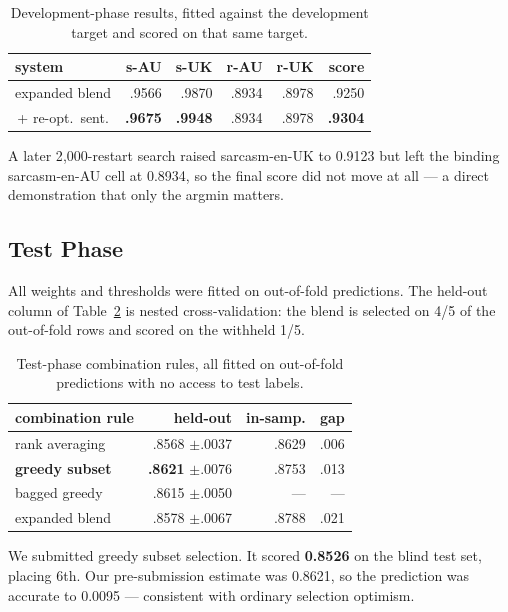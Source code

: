 \documentclass[11pt]{article}
\begin{document}
\begin{table}[t]
\centering\footnotesize
\setlength{\tabcolsep}{3.2pt}
\begin{tabular}{lrrrrr}
\toprule
system & s-AU & s-UK & r-AU & r-UK & score \\
\midrule
expanded blend & .9566 & .9870 & .8934 & .8978 & .9250 \\
\,+ re-opt.\ sent. & \textbf{.9675} & \textbf{.9948} & .8934 & .8978 & \textbf{.9304} \\
\bottomrule
\end{tabular}
\caption{Development-phase results, fitted against the development target and
scored on that same target.}
\label{tab:dev}
\end{table}

A later 2{,}000-restart search raised sarcasm-en-UK to 0.9123 but left the
binding sarcasm-en-AU cell at 0.8934, so the final score did not move at all
--- a direct demonstration that only the argmin matters.

\subsection{Test Phase}

All weights and thresholds were fitted on out-of-fold predictions. The
held-out column of Table~\ref{tab:test} is nested cross-validation: the blend
is selected on 4/5 of the out-of-fold rows and scored on the withheld 1/5.

\begin{table}[t]
\centering\footnotesize
\setlength{\tabcolsep}{4pt}
\begin{tabular}{lrrr}
\toprule
combination rule & held-out & in-samp. & gap \\
\midrule
rank averaging & .8568 {\scriptsize$\pm$.0037} & .8629 & .006 \\
\textbf{greedy subset} & \textbf{.8621} {\scriptsize$\pm$.0076} & .8753 & .013 \\
bagged greedy & .8615 {\scriptsize$\pm$.0050} & --- & --- \\
expanded blend & .8578 {\scriptsize$\pm$.0067} & .8788 & .021 \\
\bottomrule
\end{tabular}
\caption{Test-phase combination rules, all fitted on out-of-fold predictions
with no access to test labels.}
\label{tab:test}
\end{table}

We submitted greedy subset selection. It scored \textbf{0.8526} on the blind
test set, placing 6th. Our pre-submission estimate was 0.8621, so the
prediction was accurate to 0.0095 --- consistent with ordinary selection
optimism.
\end{document}

